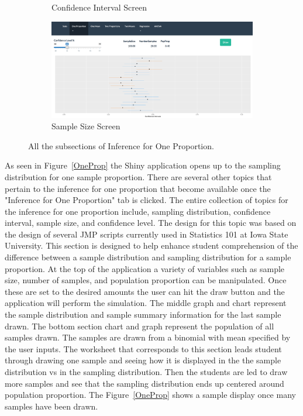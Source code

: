 \documentclass[11pt]{book}
\begin{document}
\begin{figure}
\begin{subfigure}[b]{0.5\textwidth}
                \caption{Confidence Interval Screen } 
                \label{fig:OnePropCI}
        \end{subfigure}
	\quad
        \begin{subfigure}[b]{0.5\textwidth}
                \includegraphics[width=\textwidth]{OnePropSampSize.png}
                \caption{Sample Size Screen}
                \label{fig:OnePropSampSize}
        \end{subfigure}%
	
\label{AllWeather}
\caption {All the subsections of Inference for One Proportion.}
\end{figure}

As seen in Figure~\ref{OneProp} the Shiny application opens up to the sampling distribution for one sample proportion.  There are several other topics that pertain to the inference for one proportion that become available once the "Inference for One Proportion" tab is clicked.  The entire collection of topics for the inference for one proportion include, sampling distribution, confidence interval, sample size, and confidence level.   The design for this topic was based on the design of several JMP scripts currently used in Statistics 101 at Iowa State University.  This section is designed to help enhance student comprehension of the difference between a sample distribution and sampling distribution for a sample proportion.  At the top of the application a variety of variables such as sample size, number of samples, and population proportion can be manipulated.  Once these are set to the desired amounts the user can hit the draw button and the application will perform the simulation.  The middle graph and chart represent the sample distribution and sample summary information for the last sample drawn.  The bottom section chart and graph represent the population of all samples drawn.  The samples are drawn from a binomial with mean specified by the user inputs.  The worksheet that corresponds to this section leads student through drawing one sample and seeing how it is displayed in the the sample distribution vs in the sampling distribution. Then the students are led to draw more samples and see that the sampling distribution ends up centered around population proportion.  The Figure~\ref{OneProp} shows a sample display once many samples have been drawn.
\end{document}
